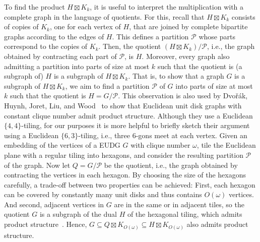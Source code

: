 \documentclass[11pt]{article}
\newcommand{\calP}{\ensuremath{\mathcal{P}}\xspace}
\begin{document}
%
To find the product $ H \boxtimes K_k $, it is useful to interpret the multiplication with a complete graph in the language of quotients.
For this, recall that $ H \boxtimes K_k $ consists of copies of $ K_k $, one for each vertex of $ H $, that are joined by complete bipartite graphs according to the edges of $ H $.
This defines a partition \calP whose parts correspond to the copies of $ K_k $.
Then, the quotient $ (H \boxtimes K_k) / \calP $, i.e., the graph obtained by contracting each part of \calP, is $ H $.
Moreover, every graph also admitting a partition into parts of size at most $ k $ such that the quotient is (a subgraph of) $ H $ is a subgraph of $ H \boxtimes K_k $.
That is, to show that a graph $ G $ is a subgraph of $ H \boxtimes K_k $, we aim to find a partition \calP of $ G $ into parts of size at most $ k $ such that the quotient is $ H = G / \calP $.
%
This observation is also used by Dvořák, Huynh, Joret, Liu, and Wood~\cite{dvorak_notes_2021} to show that Euclidean unit disk graphs with constant clique number admit product structure.
Although they use a Euclidean $ \{ 4, 4 \} $-tiling, for our purposes it is more helpful to briefly sketch their argument using a Euclidean $ \{ 6, 3 \} $-tiling, i.e., three 6-gons meet at each vertex.
%
Given an embedding of the vertices of a EUDG $G$ with clique number $ \omega $, tile the Euclidean plane with a regular tiling into hexagons, and consider the resulting partition $\calP$ of the graph.
Now let $ Q = G / \calP $ be the quotient, i.e., the graph obtained by contracting the vertices in each hexagon.
By choosing the size of the hexagons carefully, a trade-off between two properties can be achieved: 
First, each hexagon can be covered by constantly many unit disks and thus contains $ O(\omega) $ vertices.
And second, adjacent vertices in $ G $ are in the same or in adjacent tiles, so the quotient $ G $ is a subgraph of the dual $ H $ of the hexagonal tiling, which admits product structure~\cite{dujmovic_planar_2019}.
Hence, $ G \subseteq Q \boxtimes K_{O(\omega)} \subseteq H \boxtimes K_{O(\omega)} $ also admits product structure.
\end{document}
